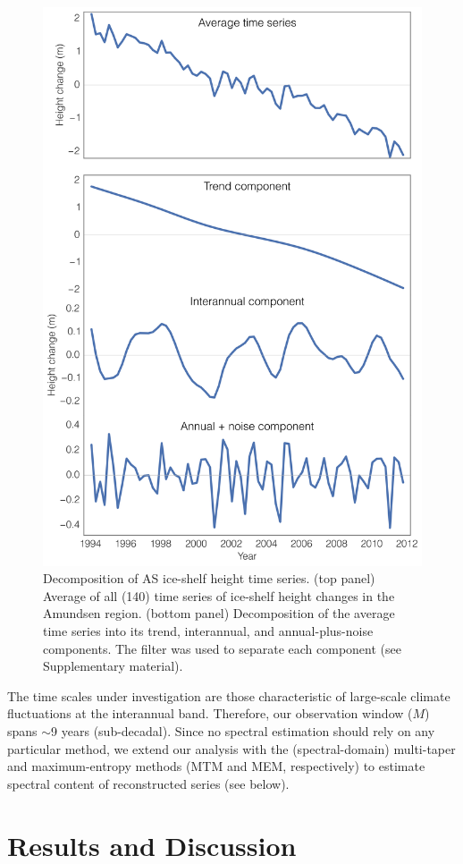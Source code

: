 \begin{figure}[!h]
  \centering
  \includegraphics[width=.7\textwidth]{img/decompose_series_v2.png}
  \caption[Decomposition of AS ice-shelf height time-series]{
  Decomposition of AS ice-shelf height time series. (top panel) Average of all (140) time series of ice-shelf height changes in the Amundsen region. (bottom panel) Decomposition of the average time series into its trend, interannual, and annual-plus-noise components. The \textcite{Hodrick1997} filter was used to separate each component (see Supplementary material).
  }
  \label{fig:series-decomposition}
\end{figure}


The time scales under investigation are those characteristic of large-scale climate fluctuations at the interannual band. Therefore, our observation window ($M$) spans $\sim$9 years (sub-decadal). Since no spectral estimation should rely on any particular method, we extend our analysis with the (spectral-domain) multi-taper \parencite{Thomson1982} and maximum-entropy \parencite{Childers1978} methods (MTM and MEM, respectively) to estimate spectral content of reconstructed series (see below).


\section{Results and Discussion}

